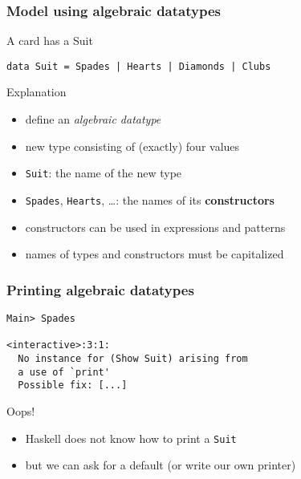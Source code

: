 \documentclass{beamer}
\begin{document}
\begin{frame}[fragile]
  \frametitle{Model using algebraic datatypes}
  \begin{block}{A card has a Suit}
\begin{lstlisting}
data Suit = Spades | Hearts | Diamonds | Clubs
\end{lstlisting}
  \end{block}
  \begin{alertblock}{Explanation}
    \begin{itemize}
    \item define an \emph{algebraic datatype}
    \item new type consisting of (exactly) four values
    \item \lstinline{Suit}: the name of the new type
    \item \lstinline{Spades}, \lstinline{Hearts}, \dots: the names of its
      \textbf{constructors}
    \item constructors can be used in expressions and patterns
    \item names of types and constructors must be capitalized
    \end{itemize}
  \end{alertblock}
\end{frame}
\begin{frame}[fragile]
  \frametitle{Printing algebraic datatypes}
\begin{verbatim}
Main> Spades

<interactive>:3:1:
  No instance for (Show Suit) arising from
  a use of `print'
  Possible fix: [...] 
\end{verbatim}

  \begin{alertblock}{Oops!}
    \begin{itemize}
    \item Haskell does not know how to print a \texttt{Suit}
    \item but we can ask for a default (or write our own printer)
    \end{itemize}
  \end{alertblock}
\end{frame}
\end{document}
